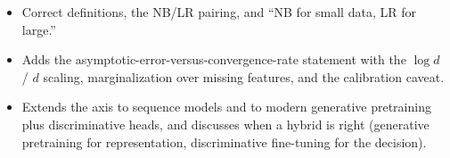 \begin{interviewq}

\goodgreat
\begin{itemize}
    \item {} Correct definitions, the NB/LR pairing, and ``NB for small data, LR for large.''
    \item {} Adds the asymptotic-error-versus-convergence-rate statement with the $\log d$ / $d$ scaling, marginalization over missing features, and the calibration caveat.
    \item {} Extends the axis to sequence models and to modern generative pretraining plus discriminative heads, and discusses when a hybrid is right (generative pretraining for representation, discriminative fine-tuning for the decision).
\end{itemize}

\end{interviewq}

